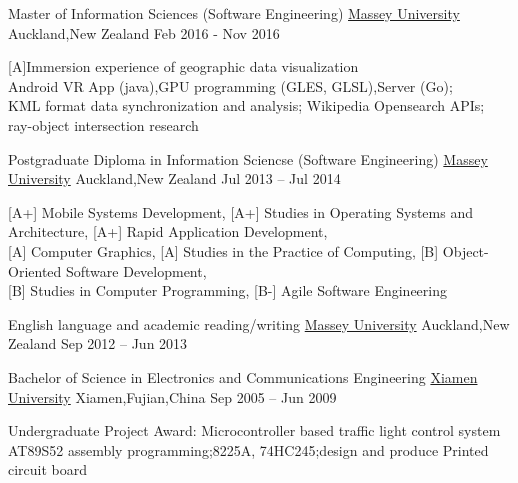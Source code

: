 
\begin{cventries}
\cventry
{Master of Information Sciences (Software Engineering)}
{\href{http://www.massey.ac.nz/}{Massey University}}
{Auckland,\enskip New Zealand}
{Feb 2016 - Nov 2016}
{
	\begin{cvitems}
		\item {[A]Immersion experience of geographic data visualization\\
			Android VR App (java),\enskip GPU programming (GLES, GLSL),\enskip Server (Go);\\
			KML format data synchronization and analysis;\enskip 
			Wikipedia Opensearch APIs;\enskip 
			ray-object intersection research}
	\end{cvitems}
}
\end{cventries}

\begin{cventries}
	\cventry
	{Postgraduate Diploma in Information Sciencse (Software Engineering)}
	{\href{http://www.massey.ac.nz/}{Massey University}}
	{Auckland,\enskip New Zealand}
	{Jul 2013 – Jul 2014}
	{
		\begin{cvitems}
			\item{[A+] Mobile Systems Development},\enskip
			{[A+] Studies in Operating Systems and Architecture},\enskip
			{[A+] Rapid Application Development},\\
			{[A] Computer Graphics},\enskip
			{[A] Studies in the Practice of Computing},\enskip
			{[B] Object-Oriented Software Development},\\
			{[B] Studies in Computer Programming},\enskip
			{[B-] Agile Software Engineering}
		\end{cvitems}
	}
\end{cventries}

\begin{cventries}
	\cventry
	{English language and academic reading/writing}
	{\href{http://www.massey.ac.nz/}{Massey University}}
	{Auckland,\enskip New Zealand}
	{Sep 2012 – Jun 2013}
	{
		\begin{cvitems}
		\end{cvitems}
	}
\end{cventries}

\begin{cventries}
	\cventry
	{Bachelor of Science in Electronics and Communications Engineering}
	{\href{http://www.xmu.edu.cn/en/}{Xiamen University}}
	{Xiamen,\enskip Fujian,\enskip China}
	{Sep 2005 – Jun 2009}
	{
		\begin{cvitems}
			\item {Undergraduate Project Award: Microcontroller based traffic light control system\\
			AT89S52 assembly programming;\enskip 8225A, 74HC245;\enskip design and produce Printed circuit board}
		\end{cvitems}
	}
\end{cventries}

